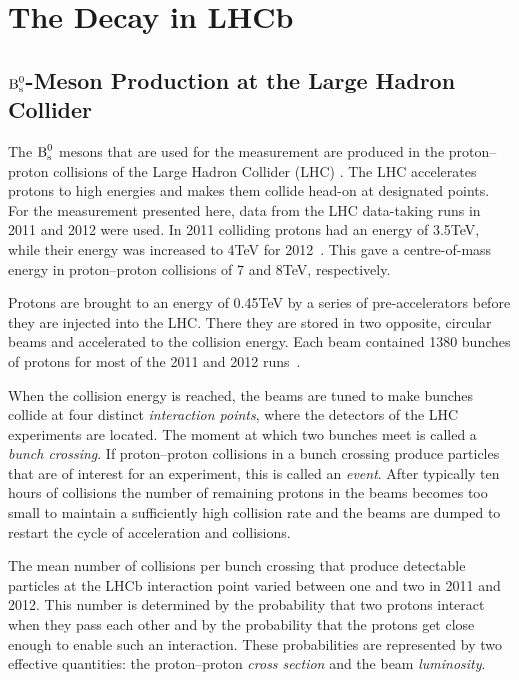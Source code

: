 \section{The \texorpdfstring{\BstoJpsiKK}{Bs0->J/psi K+K-} Decay in LHCb}
\label{sec:intro_LHCb}

\subsection{\texorpdfstring{$\text{B}_\text{s}^\text{0}$}{Bs0}-Meson Production at the Large Hadron Collider}
\label{subsec:intro_LHCb_LHC}

The $\text{B}_\text{s}^\text{0}$ mesons that are used for the \BstoJpsiKK{} measurement are produced in the proton--proton collisions of the Large Hadron Collider
(LHC) \cite{Evans:2008zzb}. The LHC accelerates protons to high energies and makes them collide head-on at designated points. For the
measurement presented here, data from the LHC data-taking runs in 2011 and 2012 were used. In 2011 colliding protons had an energy of
3.5\unitsp{}TeV, while their energy was increased to 4\unitsp{}TeV for 2012~\cite{Pojer:2013kka}. This gave a centre-of-mass energy in
proton--proton collisions of 7 and 8\unitsp{}TeV, respectively.

Protons are brought to an energy of 0.45\unitsp{}TeV by a series of pre-accelerators before they are injected into the LHC. There they are
stored in two opposite, circular beams and accelerated to the collision energy. Each beam contained 1380 bunches of  protons for
most of the 2011 and 2012 runs~\cite{Pojer:2013kka}.

When the collision energy is reached, the beams are tuned to make bunches collide at four distinct \emph{interaction points}, where the
detectors of the LHC experiments are located. The moment at which two bunches meet is called a \emph{bunch crossing}. If proton--proton
collisions in a bunch crossing produce particles that are of interest for an experiment, this is called an \emph{event}. After typically
ten hours of collisions the number of remaining protons in the beams becomes too small to maintain a sufficiently high collision rate and
the beams are dumped to restart the cycle of acceleration and collisions.

The mean number of collisions per bunch crossing that produce detectable particles at the LHCb interaction point varied between one and two
in 2011 and 2012. This number is determined by the probability that two protons interact when they pass each other and by the probability
that the protons get close enough to enable such an interaction. These probabilities are represented by two effective quantities: the
proton--proton \emph{cross section} and the beam \emph{luminosity}.

